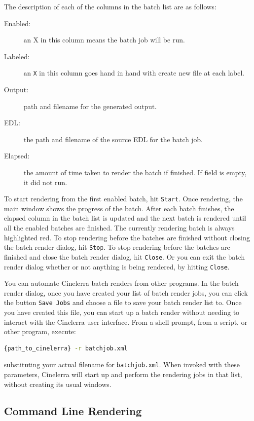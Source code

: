 The description of each of the columns in the batch list are as follows:

\begin{description}
    \item[Enabled:] an X in this column means the batch job will be run.
    \item[Labeled:] an \texttt{X} in this column goes hand in hand with create new file at each label.
    \item[Output:] path and filename for the generated output.
    \item[EDL:] the path and filename of the source EDL for the batch job.
    \item[Elapsed:] the amount of time taken to render the batch if finished.  If field is empty, it did not run.
\end{description}
To start rendering from the first enabled batch, hit \texttt{Start}.  Once rendering, the main window shows the progress of the batch. After each batch finishes, the elapsed column in the batch list is updated and the next batch is rendered until all the enabled batches are finished.  The currently rendering batch is always highlighted red.  To stop rendering before the batches are finished without closing the batch render dialog, hit \texttt{Stop}.  To stop rendering before the batches are finished and close the batch render dialog, hit \texttt{Close}.  Or you can exit the batch render dialog whether or not anything is being rendered, by hitting \texttt{Close}.

You can automate Cinelerra batch renders from other programs.  In the batch render dialog, once you have created your list of batch render jobs, you can click the button \texttt{Save Jobs} and choose a file to save your batch render list to.  Once you have created this file, you can start up a batch render without needing to interact with the Cinelerra user interface.  From a shell prompt, from a script, or other program, execute:

\begin{lstlisting}[language=bash]
    {path_to_cinelerra} -r batchjob.xml
\end{lstlisting}
substituting  your actual filename for \texttt{batchjob.xml}.  When invoked with these parameters, Cinelerra will start up and perform the rendering jobs in that list, without creating its usual windows.

\subsection{Command Line Rendering}%
\label{sub:command_line_rendering}


